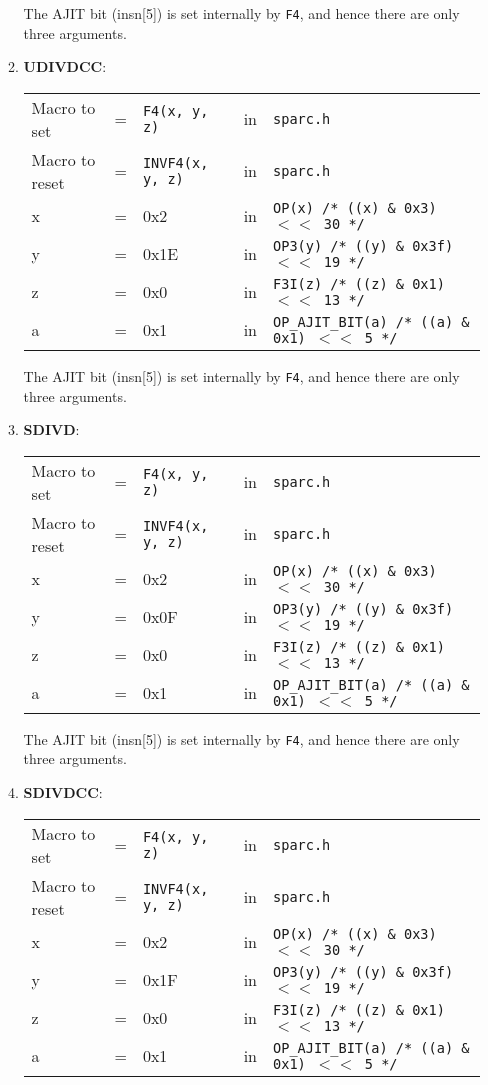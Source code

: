 \begin{itemize}
\begin{enumerate}
    The AJIT bit  (insn[5]) is set internally by  \texttt{F4}, and hence
    there are only three arguments.

  \item \textbf{UDIVDCC}:\\
    \begin{tabular}[h]{lclcl}
      Macro to set  &=& \texttt{F4(x, y, z)} &in& \texttt{sparc.h}     \\
      Macro to reset  &=& \texttt{INVF4(x, y, z)} &in& \texttt{sparc.h}     \\
      x &=& 0x2      &in& \texttt{OP(x)  /* ((x) \& 0x3)  $<<$ 30 */} \\
      y &=& 0x1E     &in& \texttt{OP3(y) /* ((y) \& 0x3f) $<<$ 19 */} \\
      z &=& 0x0      &in& \texttt{F3I(z) /* ((z) \& 0x1)  $<<$ 13 */} \\
      a &=& 0x1      &in& \texttt{OP\_AJIT\_BIT(a) /* ((a) \& 0x1)  $<<$ 5 */}
    \end{tabular}

    The AJIT bit  (insn[5]) is set internally by  \texttt{F4}, and hence
    there are only three arguments.

  \item \textbf{SDIVD}:\\
    \begin{tabular}[h]{lclcl}
      Macro to set  &=& \texttt{F4(x, y, z)} &in& \texttt{sparc.h}     \\
      Macro to reset  &=& \texttt{INVF4(x, y, z)} &in& \texttt{sparc.h}     \\
      x &=& 0x2      &in& \texttt{OP(x)  /* ((x) \& 0x3)  $<<$ 30 */} \\
      y &=& 0x0F     &in& \texttt{OP3(y) /* ((y) \& 0x3f) $<<$ 19 */} \\
      z &=& 0x0      &in& \texttt{F3I(z) /* ((z) \& 0x1)  $<<$ 13 */} \\
      a &=& 0x1      &in& \texttt{OP\_AJIT\_BIT(a) /* ((a) \& 0x1)  $<<$ 5 */}
    \end{tabular}

    The AJIT bit  (insn[5]) is set internally by  \texttt{F4}, and hence
    there are only three arguments.

  \item \textbf{SDIVDCC}:\\
    \begin{tabular}[h]{lclcl}
      Macro to set  &=& \texttt{F4(x, y, z)} &in& \texttt{sparc.h}     \\
      Macro to reset  &=& \texttt{INVF4(x, y, z)} &in& \texttt{sparc.h}     \\
      x &=& 0x2      &in& \texttt{OP(x)  /* ((x) \& 0x3)  $<<$ 30 */} \\
      y &=& 0x1F     &in& \texttt{OP3(y) /* ((y) \& 0x3f) $<<$ 19 */} \\
      z &=& 0x0      &in& \texttt{F3I(z) /* ((z) \& 0x1)  $<<$ 13 */} \\
      a &=& 0x1      &in& \texttt{OP\_AJIT\_BIT(a) /* ((a) \& 0x1)  $<<$ 5 */}
    \end{tabular}


\end{enumerate}
\end{itemize}
